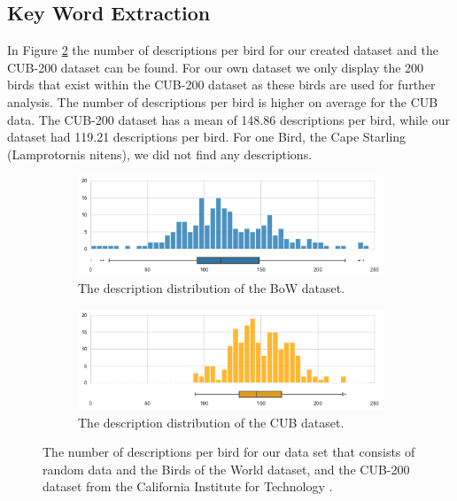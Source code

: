 \documentclass[a4paper, 12pt, oneside]{book} %
\begin{document}
\subsection{Key Word Extraction} \label{par:results_keywords}
In Figure \ref{fig:CUB_distribution} the number of descriptions per bird for our created dataset and the CUB-200 dataset can be found.
For our own dataset we only display the 200 birds that exist within the CUB-200 dataset as these birds are used for further analysis.
The number of descriptions per bird is higher on average for the CUB data.
The CUB-200 dataset has a mean of 148.86 descriptions per bird, while our dataset had 119.21 descriptions per bird.
For one Bird, the Cape Starling (Lamprotornis nitens), we did not find any descriptions.
\begin{figure} [htpb]
     \centering
     \begin{subfigure}[b]{1\textwidth}
         \centering
         \includegraphics[width=\textwidth]{figures/CUB_distribution_BOW.pdf}
         \caption{The description distribution of the BoW dataset.}
         \label{fig:BOW_distribution}
     \end{subfigure}
     \vfill
     \begin{subfigure}[b]{1\textwidth}
         \centering
         \includegraphics[width=\textwidth]{figures/CUB_distribution_CUB.pdf}
         \caption{The description distribution of the CUB dataset.}
         \label{fig:CUB_distribution}
     \end{subfigure}
     \caption[Bird description distribution]{The number of descriptions per bird for our data set that consists of random data and the Birds of the World dataset, and the CUB-200 dataset from the California Institute for Technology \autocite{welinder_caltech-ucsd_2010}. }
 \label{fig:CUBBOW_distribution}
\end{figure}
\end{document}
